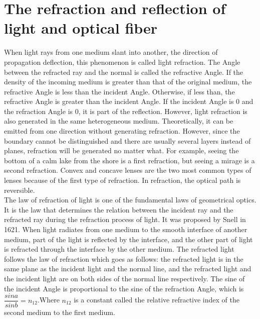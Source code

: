 \documentclass[a4paper]{article}
\begin{document}
\section{The refraction and reflection of light and optical fiber}
\label{sec:Sec3}
When light rays from one medium slant into another, the direction of propagation deflection, this phenomenon is called light refraction. The Angle between the refracted ray and the normal is called the refractive Angle. If the density of the incoming medium is greater than that of the original medium, the refractive Angle is less than the incident Angle. Otherwise, if less than, the refractive Angle is greater than the incident Angle. If the incident Angle is 0 and the refraction Angle is 0, it is part of the reflection.\cite{Optical Fibre} However, light refraction is also generated in the same heterogeneous medium. Theoretically, it can be emitted from one direction without generating refraction. However, since the boundary cannot be distinguished and there are usually several layers instead of planes, refraction will be generated no matter what. For example, seeing the bottom of a calm lake from the shore is a first refraction, but seeing a mirage is a second refraction. Convex and concave lenses are the two most common types of lenses because of the first type of refraction. In refraction, the optical path is reversible.
\\

The law of refraction of light is one of the fundamental laws of geometrical optics. It is the law that determines the relation between the incident ray and the refracted ray during the refraction process of light. It was proposed by Snell in 1621. When light radiates from one medium to the smooth interface of another medium, part of the light is reflected by the interface, and the other part of light is refracted through the interface by the other medium. The refracted light follows the law of refraction which goes as follows: the refracted light is in the same plane as the incident light and the normal line, and the refracted light and the incident light are on both sides of the normal line respectively. The sine of the incident Angle is proportional to the sine of the refraction Angle, which is $\dfrac{sina}{sinb}= n_{12}$.Where $n_{12}$ is a constant called the relative refractive index of the second medium to the first medium.\cite{Optical Fibre}
\\
\end{document}
